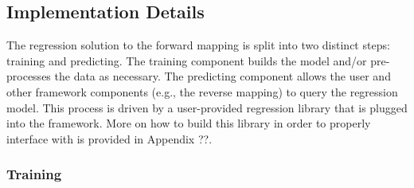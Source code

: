 \subsection{Implementation Details}

The \fw regression solution to the forward mapping is split into two distinct steps: training and predicting.
The training component builds the model and/or pre-processes the data as necessary.
The predicting component allows the user and other framework components (e.g., the reverse mapping) to query the regression model.
This process is driven by a user-provided regression library that is plugged into the framework.
More on how to build this library in order to properly interface with \fw is provided in Appendix ??.

\subsubsection{Training}

